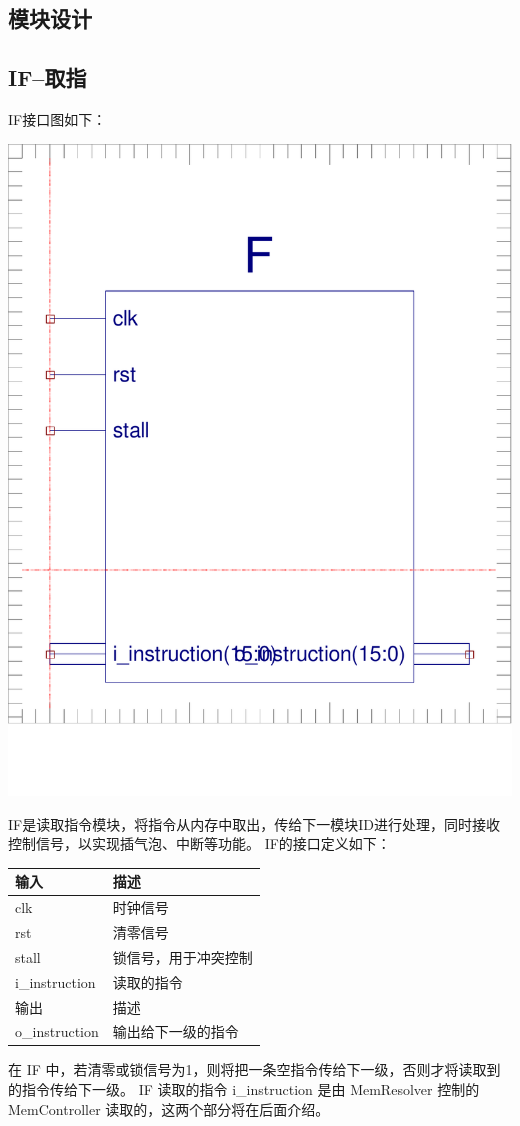 \documentclass[10pt]{article}
\begin{document}
\begin{CJK}{UTF8}{gbsn}
\section{模块设计}
\subsection{IF--取指}
IF接口图如下：\\
\begin{center}
\includegraphics[width=0.5\linewidth]{IF.pdf}
\end{center}

IF是读取指令模块，将指令从内存中取出，传给下一模块ID进行处理，同时接收控制信号，以实现插气泡、中断等功能。
IF的接口定义如下：\\
\begin{center}
\begin{tabular}{|l|l|}\hline
输入&描述\\\hline
clk&时钟信号\\\hline
rst&清零信号\\\hline
stall&锁信号，用于冲突控制\\\hline
i\_instruction&读取的指令\\\hline\hline
输出&描述\\\hline
o\_instruction&输出给下一级的指令\\\hline
\end{tabular}
\end{center}
在 IF 中，若清零或锁信号为1，则将把一条空指令传给下一级，否则才将读取到的指令传给下一级。
IF 读取的指令 i\_instruction 是由 MemResolver 控制的 MemController 读取的，这两个部分将在后面介绍。


\end{CJK}
\end{document}
